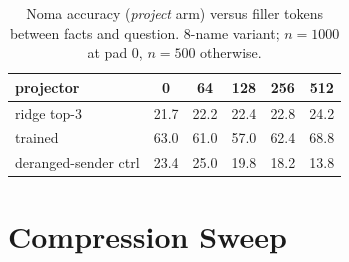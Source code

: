\documentclass{article}
\begin{document}
\begin{table}[h]
\caption{Noma accuracy (\emph{project} arm) versus filler tokens between facts and question. 8-name variant; $n = 1000$ at pad 0, $n = 500$ otherwise.}
\label{tab:distance}
\vskip 0.1in
\begin{center}
\begin{small}
\begin{tabular}{lccccc}
\toprule
projector & 0 & 64 & 128 & 256 & 512 \\
\midrule
ridge top-3          & 21.7 & 22.2 & 22.4 & 22.8 & 24.2 \\
trained              & 63.0 & 61.0 & 57.0 & 62.4 & 68.8 \\
deranged-sender ctrl & 23.4 & 25.0 & 19.8 & 18.2 & 13.8 \\
\bottomrule
\end{tabular}
\end{small}
\end{center}
\end{table}



\section{Compression Sweep}
\label{app:compress}
\end{document}

